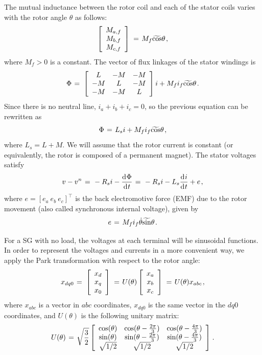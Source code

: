 \documentclass[letterpaper, 10 pt, conference]{ieeeconf}  %
\newcommand{\BE}{\begin{equation}}
\newcommand{\BEQ}[1]{\BE\label{#1}} %
\newcommand{\m}      {{\hbox{\hskip 1pt}}}
\newcommand{\dd}     {{\rm d\hbox{\hskip 0.5pt}}}
\begin{document}
The mutual inductance between the rotor coil and each of the stator
coils varies with the rotor angle $\theta$ as follows:
$$ \left[\begin{array}{c} M_{a,f}\\ M_{b,f}\\ M_{c,f}\end{array}
   \right] \m=\m M_{f}\widetilde{\cos}\theta \m,$$
where $M_f>0$ is a constant. The vector of flux linkages of the stator
windings is
$$ \Phi \m=\m \left[\begin{array}{ccc} L & -M & -M\\ -M & L & -M\\
   -M & -M & L \end{array}\right]i + M_f i_f\widetilde{\cos}\theta
   \m.$$
Since there is no neutral line, $i_a+i_b+i_c=0$, so the previous
equation can be rewritten as 
$$\Phi \m=\m L_s i + M_f i_f \widetilde{\cos}\theta \m,$$
where $L_s=L+M$. We will assume that the rotor current is constant
(or equivalently, the rotor is composed of a permanent magnet). The
stator voltages satisfy
\BEQ{eq:SGTerminalVlotage}
   v - v^n \m=\m -R_{s}i-\frac{\dd\Phi}{\dd t} \m=\m -R_{s}i-L_{s}
   \frac{\dd i}{\dd t} + e \m,
\end{equation}
where $e=\left[e_a\ e_b\ e_c \right] ^\top$ is the back electromotive 
force (EMF) due to the rotor movement (also called synchronous 
internal voltage), given by \vspace{-2mm}
\BEQ{eq:emf}
   e \m=\m M_f i_f\dot{\theta}\widetilde{\sin}\theta \m.
\end{equation}

For a SG with no load, the voltages at each terminal
will be sinusoidal functions. In order to represent the voltages and
currents in a more convenient way, we apply the Park transformation
with respect to the rotor angle:
$$ x_{dq0} \m=\m \left[\begin{array}{c} x_{d}\\ x_{q}\\ x_{0}
   \end{array}\right] \m=\m U(\theta) \left[\begin{array}{c} x_{a}\\
   x_b\\ x_c\end{array}\right] \m=\m U(\theta) x_{abc} \m,$$
where $x_{abc}$ is a vector in $abc$ coordinates, $x_{dq0}$
is the same vector in the $dq0$ coordinates, and $U(\theta)$ is the
following unitary matrix:
\BEQ{eq:ParkTransformation}
 U(\theta) \m=\m \sqrt{\frac{3}{2}}\left[\begin{array}{ccc}
   \cos(\theta) & \cos(\theta-\frac{2\pi}{3}) & \cos(\theta-
   \frac{4\pi}{3})\\ \sin(\theta) & \sin(\theta-\frac{2\pi}{3})
   & \sin(\theta-\frac{4\pi}{3})\\ \sqrt{1/2} & \sqrt{1/2} & 
   \sqrt{1/2} \end{array}\right] \m.
\end{equation}
\end{document}
